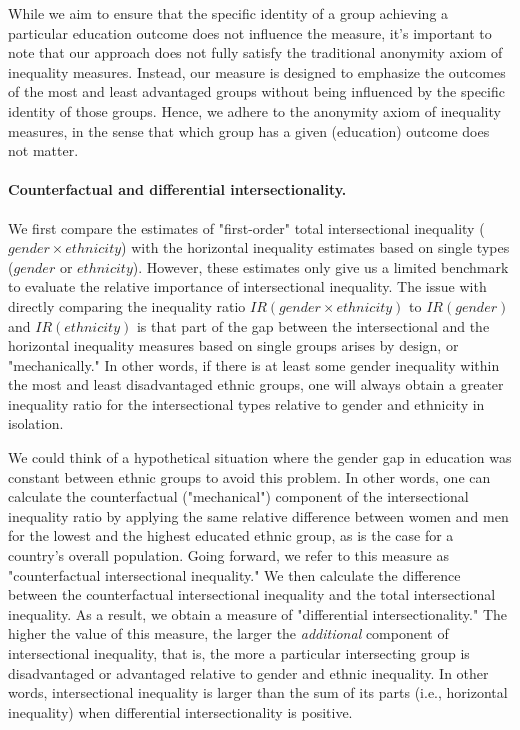While we aim to ensure that the specific identity of a group achieving a particular education outcome does not influence the measure, it's important to note that our approach does not fully satisfy the traditional anonymity axiom of inequality measures. Instead, our measure is designed to emphasize the outcomes of the most and least advantaged groups without being influenced by the specific identity of those groups. Hence, we adhere to the anonymity axiom of inequality measures, in the sense that which group has a given (education) outcome does not matter. 

\hypertarget{counterfactual-and-differential-intersectionality.}{%
\paragraph{Counterfactual and differential intersectionality.}\label{counterfactual-and-differential.}}

We first compare the estimates of "first-order" total intersectional inequality ($gender \times ethnicity$) with the horizontal inequality estimates based on single types ($gender$ or $ethnicity$). However, these estimates only give us a limited benchmark to evaluate the relative importance of intersectional inequality. The issue with directly comparing the inequality ratio $IR(gender \times ethnicity)$ to $IR(gender)$ and $IR(ethnicity)$ is that part of the gap between the intersectional and the horizontal inequality measures based on single groups arises by design, or "mechanically." In other words, if there is at least some gender inequality within the most and least disadvantaged ethnic groups, one will always obtain a greater inequality ratio for the intersectional types relative to gender and ethnicity in isolation.

We could think of a hypothetical situation where the gender gap in education was constant between ethnic groups to avoid this problem. In other words, one can calculate the counterfactual ("mechanical") component of the intersectional inequality ratio by applying the same relative difference between women and men for the lowest and the highest educated ethnic group, as is the case for a country's overall population. Going forward, we refer to this measure as "counterfactual intersectional inequality." We then calculate the difference between the counterfactual intersectional inequality and the total intersectional inequality. As a result, we obtain a measure of "differential intersectionality." The higher the value of this measure, the larger the \textit{additional} component of intersectional inequality, that is, the more a particular intersecting group is disadvantaged or advantaged relative to gender and ethnic inequality. In other words, intersectional inequality is larger than the sum of its parts (i.e., horizontal inequality) when differential intersectionality is positive. %

